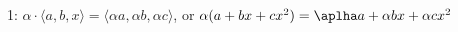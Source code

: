 \documentclass[preview]{standalone}
\begin{document}
\begin{center}
1: $\alpha \cdot \langle a, b, x\rangle = \langle \alpha a, \alpha b, \alpha c \rangle$, or $\alpha(a+bx+cx^2) = \aplha a + \alpha bx + \alpha cx^2$
\end{center}
\end{document}
